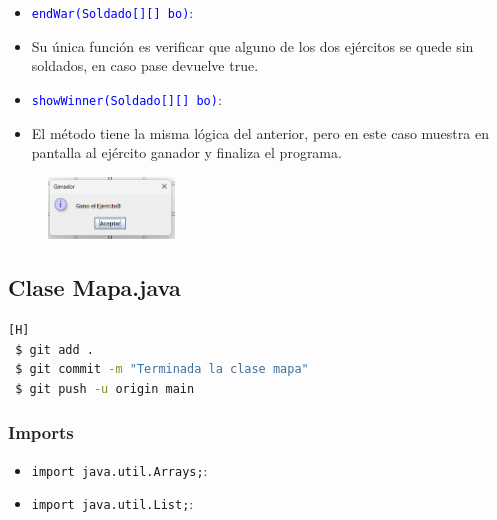 \documentclass{article}
\begin{document}

\begin{itemize}
    \item \texttt{\textcolor{blue}{endWar(Soldado[][] bo)}}: 
    \item Su única función es verificar que alguno de los dos ejércitos se quede sin soldados, en caso pase devuelve true.
\end{itemize}

\newpage
\begin{itemize}
    \item \texttt{\textcolor{blue}{showWinner(Soldado[][] bo)}}: 
    \item El método tiene la misma lógica del anterior, pero en este caso muestra en pantalla al ejército ganador y finaliza el programa.
\end{itemize}

\begin{figure}[H]
    \centering
    \includegraphics[width=0.3\textwidth,keepaspectratio]{img/vj5.png}
    \caption{}
\end{figure}

\newpage
\subsection{Clase Mapa.java}
\begin{lstlisting}[language=bash,caption={Commit \href{https://github.com/hernanchoquehuanca/fp2-23b/commit/1a0586ff7f8bb3b99f7e0c7a74e9bb209487b2c5}{379f06f}: Terminada la clase mapa
}][H]
 $ git add .
 $ git commit -m "Terminada la clase mapa"			
 $ git push -u origin main
\end{lstlisting}
\subsubsection{Imports}
\begin{itemize}
    \item \texttt{import java.util.Arrays;}: 
    \item \texttt{import java.util.List;}: 
\end{itemize}

\end{document}
